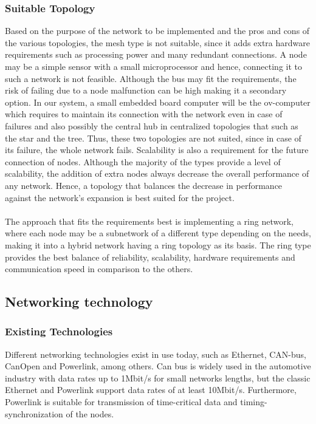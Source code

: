 \subsubsection{Suitable Topology}
Based on the purpose of the network to be implemented and the pros and cons of the various topologies, the mesh type is not suitable, since it adds extra hardware requirements such as processing power and many redundant connections. A node may be a simple sensor with a small microprocessor and hence, connecting it to such a network is not feasible. Although the bus may fit the requirements, the risk of failing due to a node malfunction can be high making it a secondary option. In our system, a small embedded board computer will be the ov-computer which requires to maintain its connection with the network even in case of failures and also possibly the central hub in centralized topologies that such as the star and the tree. Thus, these two topologies are not suited, since in case of its failure, the whole network fails. Scalability is also a requirement for the future connection of nodes. Although the majority of the types provide a level of scalability, the addition of extra nodes always decrease the overall performance of any network. Hence, a topology that balances the decrease in performance against the network's expansion is best suited for the project.\\\\
The approach that fits the requirements best is implementing a ring network, where each node may be a subnetwork of a different type depending on the needs, making it into a hybrid network having a ring topology as its basis. The ring type provides the best balance of reliability, scalability, hardware requirements and communication speed in comparison to the others.

\subsection{Networking technology}

\subsubsection{Existing Technologies}
Different networking technologies exist in use today, such as Ethernet, CAN-bus, CanOpen and Powerlink, among others. Can bus is widely used in the automotive industry with data rates up to 1Mbit/s for small networks lengths, but the classic Ethernet and Powerlink support data rates of at least 10Mbit/s. Furthermore, Powerlink is suitable for transmission of time-critical data and timing-synchronization of the nodes. 
